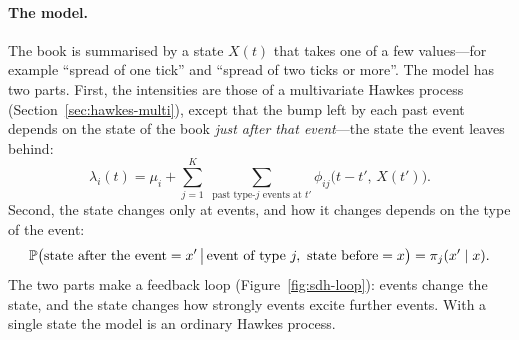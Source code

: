 \paragraph{The model.} The book is summarised by a state $X(t)$ that takes one of a few values---for example
``spread of one tick'' and ``spread of two ticks or more''. The model has two parts. First, the intensities are
those of a multivariate Hawkes process (Section~\ref{sec:hawkes-multi}), except that the bump left by each past
event depends on the state of the book \emph{just after that event}---the state the event leaves behind:
\begin{equation}
  \lambda_i(t) = \mu_i + \sum_{j=1}^{K}\;\sum_{\text{past type-}j\text{ events at } t'} \phi_{ij}\bigl(t - t',\, X(t')\bigr).
\label{eq:sdh-intensity}
\end{equation}
Second, the state changes only at events, and how it changes depends on the type of the event:
\begin{equation}
  \P\bigl(\text{state after the event} = x' \,\big|\, \text{event of type } j,\ \text{state before} = x\bigr) = \pi_j(x' \mid x).
\label{eq:sdh-state}
\end{equation}
The two parts make a feedback loop (Figure~\ref{fig:sdh-loop}): events change the state, and the state changes
how strongly events excite further events. With a single state the model is an ordinary Hawkes process.

